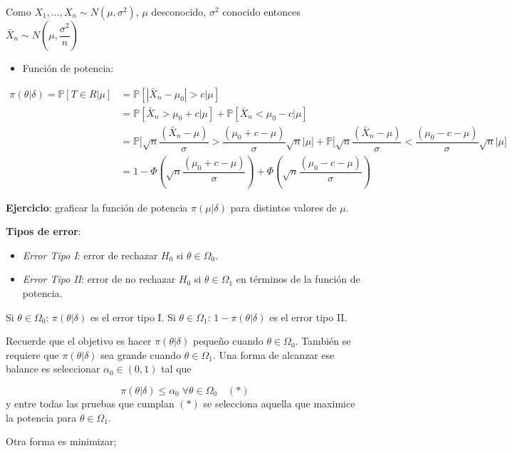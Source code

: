 \documentclass[
  12pt,
]{book}
\providecommand{\tightlist}{%
  \setlength{\itemsep}{0pt}\setlength{\parskip}{0pt}}
\begin{document}
Como \(X_1,\dots, X_n \sim N(\mu, \sigma^2)\), \(\mu\) desconocido, \(\sigma^2\) conocido entonces \(\bar X_n \sim N\left(\mu,\dfrac{\sigma^2}{n}\right)\)

\begin{itemize}
\tightlist
\item
  Función de potencia:
\end{itemize}

\begin{align*}
\pi(\theta|\delta) = \mathbb P[T\in R|\mu] & = \mathbb P [|\bar X_n -\mu_0|>c|\mu] \\ &= \mathbb P [\bar X_n > \mu_0+c|\mu] + \mathbb P [\bar X_n < \mu_0-c|\mu]\\
& =  \mathbb P \bigg[\sqrt n \dfrac{(\bar X_n-\mu)}{\sigma}> \dfrac{(\mu_0+c-\mu)}{\sigma}\sqrt n \bigg|\mu\bigg] +  \mathbb P \bigg[\sqrt n \dfrac{(\bar X_n-\mu)}{\sigma}< \dfrac{(\mu_0-c-\mu)}{\sigma}\sqrt n \bigg|\mu\bigg] \\
& = 1-\Phi\left(\sqrt n \dfrac{(\mu_0+c-\mu)}{\sigma} \right) + \Phi\left(\sqrt n \dfrac{(\mu_0-c-\mu)}{\sigma} \right) 
\end{align*}

\textbf{Ejercicio}: graficar la función de potencia \(\pi(\mu|\delta)\) para distintos valores de \(\mu\).

\textbf{Tipos de error}:

\begin{itemize}
\item
  \emph{Error Tipo I}: error de rechazar \(H_0\) si \(\theta \in \Omega_0\).
\item
  \emph{Error Tipo II}: error de no rechazar \(H_0\) si \(\theta\in\Omega_1\) en términos de la función de potencia.
\end{itemize}

Si \(\theta \in \Omega_0\): \(\pi(\theta|\delta)\) es el error tipo I. Si \(\theta \in \Omega_1\): \(1-\pi(\theta|\delta)\) es el error tipo II.

Recuerde que el objetivo es hacer \(\pi(\theta|\delta)\) pequeño cuando \(\theta\in\Omega_0\). También se requiere que \(\pi(\theta|\delta)\) sea grande cuando \(\theta \in\Omega_1\). Una forma de alcanzar ese balance es seleccionar \(\alpha_0 \in (0,1)\) tal que

\[\pi(\theta|\delta) \leq \alpha_0\;\forall \theta\in\Omega_0\quad(*)\]
y entre todas las pruebas que cumplan \((*)\) se selecciona aquella que maximice la potencia para \(\theta \in \Omega_1\).

Otra forma es minimizar;
\end{document}
